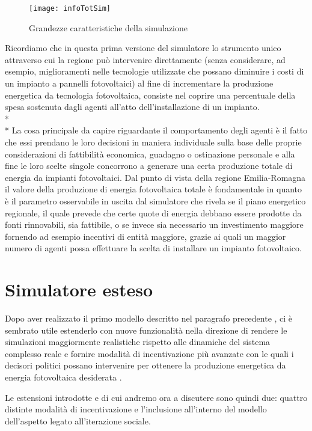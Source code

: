 \begin{figure}[hbt]
	\centering
	\texttt{[image: infoTotSim]}
	\caption{Grandezze caratteristiche della simulazione}
	\label{infoTotSim}
\end{figure}

Ricordiamo che in questa prima versione del simulatore lo strumento unico attraverso cui la regione può intervenire direttamente (senza considerare, ad esempio, miglioramenti nelle tecnologie utilizzate che possano diminuire i costi di un impianto a pannelli fotovoltaici) al fine di incrementare la produzione energetica da tecnologia fotovoltaica, consiste nel coprire una percentuale della spesa sostenuta dagli agenti all'atto dell'installazione di un impianto.\\*\\* 
La cosa principale da capire riguardante il comportamento degli agenti è il fatto che essi prendano le loro decisioni in maniera individuale sulla base delle proprie considerazioni di fattibilità economica, guadagno o ostinazione personale e alla fine le loro scelte singole concorrono a generare una certa produzione totale di energia da impianti fotovoltaici. Dal punto di vista della regione Emilia-Romagna il valore della produzione di energia fotovoltaica totale è fondamentale in quanto è il parametro osservabile in uscita dal simulatore che rivela se il piano energetico regionale, il quale prevede che certe quote di energia debbano essere prodotte da fonti rinnovabili, sia fattibile, o se invece sia necessario un investimento maggiore fornendo ad esempio incentivi di entità maggiore, grazie ai quali un maggior numero di agenti possa effettuare la scelta di installare un impianto fotovoltaico.


\section{Simulatore esteso}

Dopo aver realizzato il primo modello descritto nel paragrafo precedente \cite{tesiCroce}, ci è sembrato utile estenderlo con nuove funzionalità nella direzione di rendere le simulazioni maggiormente realistiche rispetto alle dinamiche del sistema complesso reale e fornire modalità di incentivazione più avanzate con le quali i decisori politici possano intervenire per ottenere la produzione energetica da energia fotovoltaica desiderata \cite{lavoroCerri}.

Le estensioni introdotte e di cui andremo ora a discutere sono quindi due: quattro distinte modalità di incentivazione e l'inclusione all'interno del modello dell'aspetto legato all'iterazione sociale.


